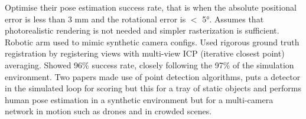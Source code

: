 Optimise their pose estimation success rate, that is when the absolute positional error is less than 3 mm and the rotational error is $<$ 5°.
Assumes that photorealistic rendering is not needed and simpler rasterization is sufficient.
Robotic arm used to mimic synthetic camera configs.
Used rigorous ground truth registration by registering views with multi-view ICP (iterative closest point) averaging.
Showed 96\% success rate, closely following the 97\% of the simulation environment.
Two papers made use of point detection algorithms, \citet{jorgensen2018simulation} puts a detector in the simulated loop for scoring but this for a tray of static objects and \citet{ci2023proactive} performs human pose estimation in a synthetic environment but for a multi-camera network in motion such as drones and in crowded scenes.

